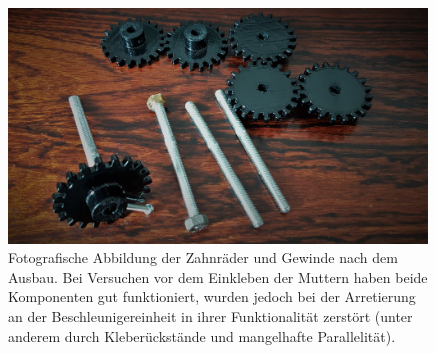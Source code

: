 \begin{figure}[htbp]
\vspace*{0.2cm}
\centering
 \includegraphics[width=0.99\textwidth]{images/toothpaste.jpg}
  \caption[Fotografie der Zahnräder und Gewinde]{Fotografische Abbildung der Zahnräder und Gewinde nach dem Ausbau. Bei Versuchen vor dem Einkleben der Muttern haben beide Komponenten gut funktioniert, wurden jedoch bei der Arretierung an der Beschleunigereinheit in ihrer Funktionalität zerstört (unter anderem durch Kleberückstände und mangelhafte Parallelität).}
  \label{fig:toothpaste}
  \vspace{-0pt}
\end{figure}